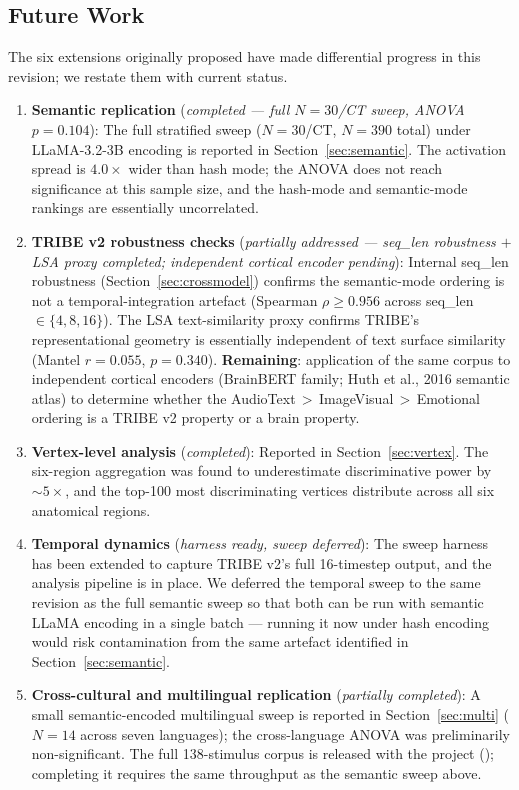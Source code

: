 \documentclass[11pt,letterpaper]{article}
\begin{document}
\subsection{Future Work}\label{sec:futurework}

The six extensions originally proposed have made differential progress in this revision; we restate them with current status.

\begin{enumerate}[leftmargin=1.4em,itemsep=3pt,topsep=2pt]
\item \textbf{Semantic replication} (\textit{completed --- full $N=30$/CT sweep, ANOVA $p=0.104$}): The full stratified sweep ($N=30$/CT, $N=390$ total) under LLaMA-3.2-3B encoding is reported in Section~\ref{sec:semantic}. The activation spread is $4.0\times$ wider than hash mode; the ANOVA does not reach significance at this sample size, and the hash-mode and semantic-mode rankings are essentially uncorrelated.
\item \textbf{TRIBE v2 robustness checks} (\textit{partially addressed --- seq\_len robustness $+$ LSA proxy completed; independent cortical encoder pending}): Internal seq\_len robustness (Section~\ref{sec:crossmodel}) confirms the semantic-mode ordering is not a temporal-integration artefact (Spearman $\rho \geq 0.956$ across seq\_len $\in \{4, 8, 16\}$). The LSA text-similarity proxy confirms TRIBE's representational geometry is essentially independent of text surface similarity (Mantel $r = 0.055$, $p = 0.340$). \textbf{Remaining}: application of the same corpus to independent cortical encoders (BrainBERT family; Huth et al., 2016 semantic atlas) to determine whether the AudioText\,$>$\,ImageVisual\,$>$\,Emotional ordering is a TRIBE v2 property or a brain property.
\item \textbf{Vertex-level analysis} (\textit{completed}): Reported in Section~\ref{sec:vertex}. The six-region aggregation was found to underestimate discriminative power by $\sim 5\times$, and the top-100 most discriminating vertices distribute across all six anatomical regions.
\item \textbf{Temporal dynamics} (\textit{harness ready, sweep deferred}): The sweep harness has been extended to capture TRIBE v2's full 16-timestep output, and the analysis pipeline is in place. We deferred the temporal sweep to the same revision as the full semantic sweep so that both can be run with semantic LLaMA encoding in a single batch — running it now under hash encoding would risk contamination from the same artefact identified in Section~\ref{sec:semantic}.
\item \textbf{Cross-cultural and multilingual replication} (\textit{partially completed}): A small semantic-encoded multilingual sweep is reported in Section~\ref{sec:multi} ($N=14$ across seven languages); the cross-language ANOVA was preliminarily non-significant. The full 138-stimulus corpus is released with the project (); completing it requires the same throughput as the semantic sweep above.
\end{enumerate}
\end{document}
